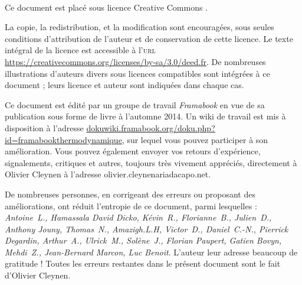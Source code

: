 \clearpage\thispagestyle{empty}



\vspace{-0.5cm}
{\center \normalsize \huge \ccLogo\ \ccAttribution\ \ccShareAlike \par}
\vspace{0.5cm}

Ce document est placé sous licence Creative Commons \myccbysa.

La copie, la redistribution, et la modification sont encouragées, sous seules conditions d’attribution de l’auteur et de conservation de cette licence. Le texte intégral de la licence est accessible à l’\textsc{url} \href{https://creativecommons.org/licenses/by-sa/3.0/deed.fr}{https://creativecommons.org/licenses/by-sa/3.0/deed.fr}. De nombreuses illustrations d’auteurs divers sous licences compatibles sont intégrées à ce document ; leurs licence et auteur sont indiquées dans chaque cas.

\vspace{0.3cm}
\vspace{0.1cm}

Ce document est édité par un groupe de travail \textit{Framabook} en vue de sa publication sous forme de livre à l’automne 2014. Un wiki de travail est mis à disposition à l’adresse \href{http://dokuwiki.framabook.org/doku.php?id=framabookthermodynamique}{dokuwiki.framabook.org/doku.php?id=framabookthermodynamique}, sur lequel vous pouvez participer à son amélioration. Vous pouvez également envoyer vos retours d’expérience, signalements, critiques et autres, toujours très vivement appréciés, directement à Olivier Cleynen à l’adresse olivier.cleynenariadacapo.net.

De nombreuses personnes, en corrigeant des erreurs ou proposant des améliorations, ont réduit l’entropie de ce document, parmi lesquelles : {\small\textit{Antoine\ L., Hamassala David Dicko, Kévin\ R., Florianne\ B., Julien\ D., Anthony Jouny, Thomas\ N., Amazigh.L.H, Victor\ D., Daniel\ C.-N., Pierrick Degardin, Arthur\ A., Ulrick\ M., Solène\ J., Florian Paupert, Gatien Bovyn, Mehdi\ Z., Jean-Bernard Marcon, Luc Benoit}}. L’auteur leur adresse beaucoup de gratitude ! Toutes les erreurs restantes dans le présent document sont le fait d’Olivier Cleynen.

\vspace{0.3cm}


\restoregeometry
